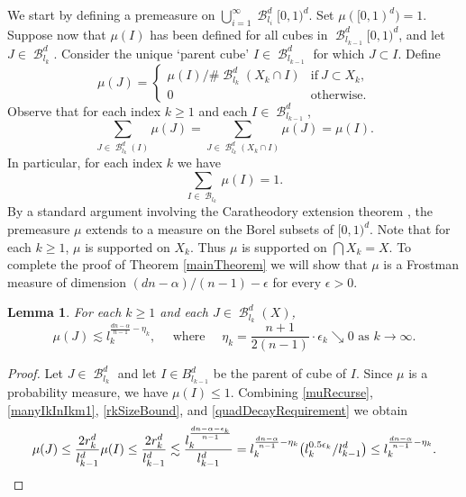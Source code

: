 \documentclass[dvipsnames,letterpaper,12pt]{article}
\numberwithin{equation}{section}
\theoremstyle{plain}
\newtheorem{lemma}{Lemma}
\theoremstyle{remark}
\DeclareMathOperator{\B}{\mathcal{B}}
\begin{document}
We start by defining a premeasure on $\bigcup_{i = 1}^\infty \B^d_{l_i}[0,1)^d$. Set $\mu([0,1)^d) = 1$. Suppose now that $\mu(I)$ has been defined for all cubes in $\B^d_{l_{k-1}}[0,1)^d$, and let $J \in \B^d_{l_k}$. Consider the unique `parent cube' $I \in \B^d_{l_{k-1}}$ for which $J \subset I$. Define
%
\begin{equation} \label{muRecurse} 
	\mu(J) = \begin{cases} {\mu(I)}/{\# \B^d_{l_k}(X_k \cap I)} & \textrm{if}\ J \subset X_k,\\
0 & \textrm{otherwise}.
\end{cases}
\end{equation}
Observe that for each index $k\geq 1$ and each $I \in \B_{l_{k-1}}^d$, 
%
\begin{equation}\label{muBreakDown}
	\sum_{J \in \B_{l_k}^d(I)} \mu(J) = \sum_{J \in \B_{l_k}^d(X_k\cap I)} \mu(J) = \mu(I).
\end{equation}
In particular, for each index $k$ we have
%
\[ \sum_{I\in\B_{l_k}}\mu(I)=1. \]
%
By a standard argument involving the Caratheodory extension theorem \cite[Proposition 1.7]{Falconer}, the premeasure $\mu$ extends to a measure on the Borel subsets of $[0,1)^d$. Note that for each $k \geq 1$, $\mu$ is supported on $X_k$. Thus $\mu$ is supported on $\bigcap X_k = X$. To complete the proof of Theorem \ref{mainTheorem} we will show that $\mu$ is a Frostman measure of dimension $(dn - \alpha)/(n - 1)-\epsilon$ for every $\epsilon>0$. 



\begin{lemma}\label{massSomeScales}
	For each $k\geq 1$ and each $J \in \B^d_{l_k}(X)$, 
	\[ \mu(J) \lesssim l_k^{\frac{dn-\alpha}{n-1}- \eta_k}, \quad \text{ where } \quad \eta_k = \frac{n+1}{2(n-1)} \cdot \epsilon_k \searrow 0 \text{ as } k \rightarrow \infty. \]
\end{lemma}
\begin{proof}
	Let $J \in \B^d_{l_k}$ and let $I \in B^d_{l_{k-1}}$ be the parent of cube of $I$. Since $\mu$ is a probability measure, we have $\mu(I) \leq 1$. Combining \eqref{muRecurse}, \eqref{manyIkInIkm1}, \eqref{rkSizeBound}, and \eqref{quadDecayRequirement} we obtain
	\[ \mu(J)\leq \frac{2r_k^d}{l_{k-1}^d}\mu(I)\leq \frac{2r_k^d}{l_{k-1}^d}\lesssim \frac{l_{k}^{\frac{dn-\alpha - \epsilon_k}{n-1}}}{l_{k-1}^d}=l_k^{\frac{dn-\alpha}{n-1}-\eta_k}\big(l_k^{0.5 \epsilon_k}/l_{k-1}^d\big)\leq l_k^{\frac{dn-\alpha}{n-1}-\eta_k}.\qedhere \]
\end{proof}
\end{document}
